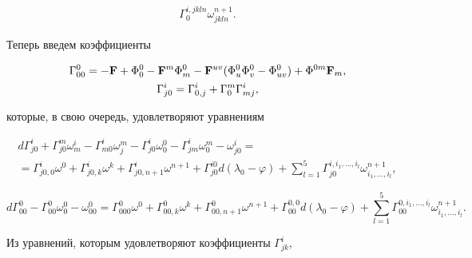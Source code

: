 \begin{notes}
\begin{align*}
\Gamma^{i,jkln}_0\omega^{n+1}_{jkln}. 


\end{align*} 


 


Теперь введем коэффициенты 


\begin{gather} 


\Gamma^0_{00}=-\bold F+\Phi^0_0-\bold F^m\Phi^0_m- 


\bold F^{uv}(\Phi^0_u\Phi^0_v-\Phi^0_{uv}) 


+\Phi^{0m}\bold F_m,\\ 


\Gamma^i_{j0}=\Gamma^i_{0,j}+\Gamma^m_0\Gamma^i_{mj},\notag 


\end{gather} 


которые, в свою очередь, удовлетворяют уравнениям 


\begin{multline*} 


d\Gamma^i_{j0}+\Gamma^m_{j0}\omega^i_m-\Gamma^i_{m0}\omega^m_j 


-\Gamma^i_{j0}\omega^0_0-\Gamma^i_{jm}\omega^m_0- 


\omega^i_{j0}= \\


=\Gamma^i_{j0,0}\omega^0+\Gamma^i_{j0,k}\omega^k+ 


\Gamma^i_{j0,n+1}\omega^{n+1} 


+\Gamma^{i0}_{j0} d(\lambda_0-\varphi)+ 


\sum^5_{l=1}\Gamma_{j0}^{i,i_1,\dotsc,i_l} 


\omega^{n+1}_{i_1,\dotsc,i_l},


\end{multline*} 


$$


d\Gamma^0_{00}-\Gamma^0_{00}\omega^0_0-\omega^0_{00}= 


\Gamma^0_{000}\omega^0+\Gamma^0_{00,k}\omega^k+ 


\Gamma^0_{00,n+1}\omega^{n+1}+ 


\Gamma^{0,0}_{00}d(\lambda_0-\varphi)+ 


\sum^5_{l=1}\Gamma_{00}^{0,i_1,\dotsc,i_l} 


\omega^{n+1}_{i_1,\dotsc,i_l}. 


$$


Из уравнений, которым удовлетворяют коэффициенты $\Gamma^i_{jk}$, 



\end{notes}
